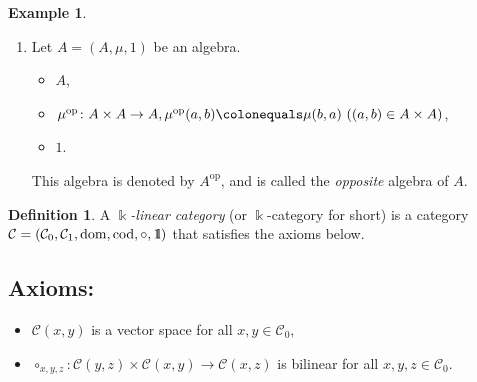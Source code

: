 \documentclass{surv-l}
\numberwithin{equation}{chapter}
\numberwithin{figure}{chapter}
\theoremstyle{plain}
\theoremstyle{definition}
\newtheorem{dfn}[thm]{Definition}
\newtheorem{exm}[thm]{Example}
\theoremstyle{remark}
\newcommand{\id}{1\kern-.25em{\text{{\rm l}}}}
\DeclareMathOperator{\dom}{dom}
\DeclareMathOperator{\cod}{cod}
\begin{document}
\begin{exm}
\begin{enumerate}
\begin{itemize}
\item
$T_n(A)\colonequals $ (the vector space consisting of the lower triangular matrices in $M_n(A)$),
\item
The usual multiplication of matrices,
\item
$E_n$.
\end{itemize}
\item
Let $A= (A, \mu, 1)$ be an algebra.
\begin{itemize}
\item
$A$,
\item
$\mu^{\mathrm{op}}\colon A\times A \to A,
\mu^{\mathrm{op}}(a,b)\colonequals \mu(b,a)\ ((a,b) \in A \times A)$,
\item
$1$.
\end{itemize}
This algebra is denoted by $A^{\mathrm{op}}$, and is called
the \emph{opposite} algebra of $A$.
\end{enumerate}
\end{exm}

\begin{dfn}
A \emph{$\Bbbk$-linear category} (or $\Bbbk$-category for short) is a category
${\mathcal{C}}=({\mathcal{C}}_0, {\mathcal{C}}_1, \dom, \cod,\circ,\id)$ that satisfies the axioms below.

\pagebreak

\subsection*{Axioms:}
\begin{itemize}
\item
${\mathcal{C}}(x,y)$ is a vector space for all $x, y \in {\mathcal{C}}_0$,
\item
$\circ_{x,y,z} \colon {\mathcal{C}}(y,z) \times {\mathcal{C}}(x,y) \to {\mathcal{C}}(x,z)$ is bilinear for all $x, y, z \in {\mathcal{C}}_0$.
\end{itemize}
\end{dfn}
\end{document}
